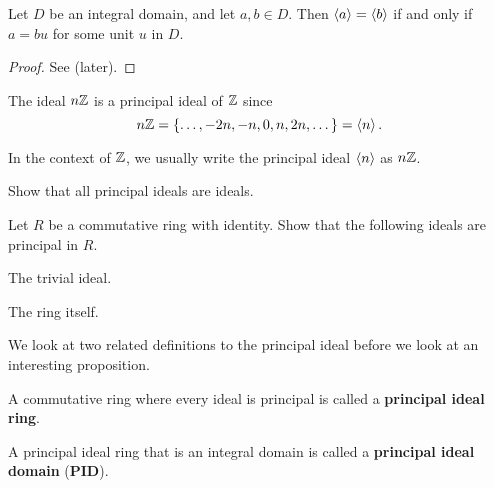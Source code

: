 \begin{proposition}\label{prop-principal-ideals-equal-iff-associates}
    Let $D$ be an integral domain, and let $a,b\in D$. Then $\left\langle a\right\rangle = \left\langle b\right\rangle$ if and only if $a = bu$ for some unit $u$ in $D$.
\end{proposition}
\begin{proof}
    See  (later).
\end{proof}

\begin{example}
    The ideal $n\mathbb{Z}$ is a principal ideal of $\mathbb{Z}$ since
    \[
        n\mathbb{Z} = \{\dots, -2n, -n, 0, n, 2n, \dots\} = \left\langle n\right\rangle.
    \]
\end{example}
\begin{remark}
    In the context of $\mathbb{Z}$, we usually write the principal ideal $\left\langle n\right\rangle$ as $n\mathbb{Z}$.
\end{remark}

\begin{exercise}\label{exercise-principal-ideal-is-ideal}
    Show that all principal ideals are ideals.
\end{exercise}

\begin{exercise}\label{exercise-trivial-ideal-and-whole-ring-are-principal-ideals}
    Let $R$ be a commutative ring with identity. Show that the following ideals are principal in $R$.
    \begin{partquestions}{\alph*}
        \item The trivial ideal.
        \item The ring itself.
    \end{partquestions}
\end{exercise}

We look at two related definitions to the principal ideal before we look at an interesting proposition.
\begin{definition}
    A commutative ring where every ideal is principal is called a \textbf{principal ideal ring}.
\end{definition}
\begin{definition}
    A principal ideal ring that is an integral domain is called a \textbf{principal ideal domain} (\textbf{PID}).
\end{definition}

